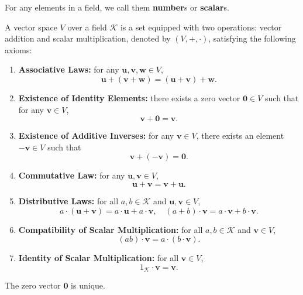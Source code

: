 \documentclass{ctexart}
\begin{document}
	\begin{myrmk}
		For any elements in a field, we call them \textbf{number}s or \textbf{scalar}s.
	\end{myrmk}
	\begin{mydef}
		A vector space $V$ over a field $\mathcal{K}$ is a set equipped with two operations:
		vector addition and scalar multiplication, denoted by $(V, +, \cdot)$, satisfying the following axioms:
		
		\begin{enumerate}
			\item \textbf{Associative Laws:} for any $\mathbf{u}, \mathbf{v}, \mathbf{w} \in V$,
			\[
			\mathbf{u} + (\mathbf{v} + \mathbf{w}) = (\mathbf{u} + \mathbf{v}) + \mathbf{w}.
			\]
			
			\item \textbf{Existence of Identity Elements:} 
			there exists a zero vector $\mathbf{0} \in V$ such that for any $\mathbf{v} \in V$, 
			\[
			\mathbf{v} + \mathbf{0} = \mathbf{v}.
			\]
			
			\item \textbf{Existence of Additive Inverses:} 
			for any $\mathbf{v} \in V$, there exists an element $-\mathbf{v} \in V$ such that 
			\[
			\mathbf{v} + (-\mathbf{v}) = \mathbf{0}.
			\]
			
			\item \textbf{Commutative Law:}
			for any $\mathbf{u}, \mathbf{v} \in V$,
			\[
			\mathbf{u} + \mathbf{v} = \mathbf{v} + \mathbf{u}. 
			\]
			
			\item \textbf{Distributive Laws:} 
			for all $a, b \in \mathcal{K}$ and $\mathbf{u}, \mathbf{v} \in V$,
			\[
			a \cdot (\mathbf{u} + \mathbf{v}) = a \cdot \mathbf{u} + a \cdot \mathbf{v}, 
			\quad (a + b) \cdot \mathbf{v} = a \cdot \mathbf{v} + b \cdot \mathbf{v}.
			\]
			
			\item \textbf{Compatibility of Scalar Multiplication:} 
			for all $a, b \in \mathcal{K}$ and $\mathbf{v} \in V$,
			\[
			(a b) \cdot \mathbf{v} = a \cdot (b \cdot \mathbf{v}).
			\]
			
			\item \textbf{Identity of Scalar Multiplication:} 
			for all $\mathbf{v} \in V$,
			\[
			1_{\mathcal{K}} \cdot \mathbf{v} = \mathbf{v}.
			\]
		\end{enumerate}
	\end{mydef}
	\begin{mythm}
		The zero vector $\mathbf{0}$ is unique.
	\end{mythm}
\end{document}
